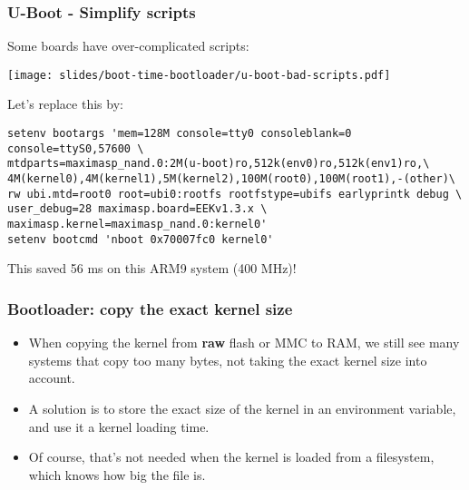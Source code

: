 \begin{frame}[fragile]
\frametitle{U-Boot - Simplify scripts}
Some boards have over-complicated scripts:
\begin{center}
    \texttt{[image: slides/boot-time-bootloader/u-boot-bad-scripts.pdf]}
\end{center}
Let's replace this by:
\begin{block}{}
\footnotesize
\begin{verbatim}
setenv bootargs 'mem=128M console=tty0 consoleblank=0
console=ttyS0,57600 \
mtdparts=maximasp_nand.0:2M(u-boot)ro,512k(env0)ro,512k(env1)ro,\
4M(kernel0),4M(kernel1),5M(kernel2),100M(root0),100M(root1),-(other)\
rw ubi.mtd=root0 root=ubi0:rootfs rootfstype=ubifs earlyprintk debug \
user_debug=28 maximasp.board=EEKv1.3.x \
maximasp.kernel=maximasp_nand.0:kernel0'
setenv bootcmd 'nboot 0x70007fc0 kernel0'
\end{verbatim}
\end{block}
This saved 56 ms on this ARM9 system (400 MHz)!
\end{frame}

\begin{frame}
\frametitle{Bootloader: copy the exact kernel size}
\begin{itemize}
\item When copying the kernel from {\bf raw} flash or MMC to RAM, we still see
      many systems that copy too many bytes, not taking the
      exact kernel size into account.
\item A solution is to store the exact size of the kernel in an environment
      variable, and use it a kernel loading time.
\item Of course, that's not needed when the kernel is loaded from a
      filesystem, which knows how big the file is.
\end{itemize}
\end{frame}
